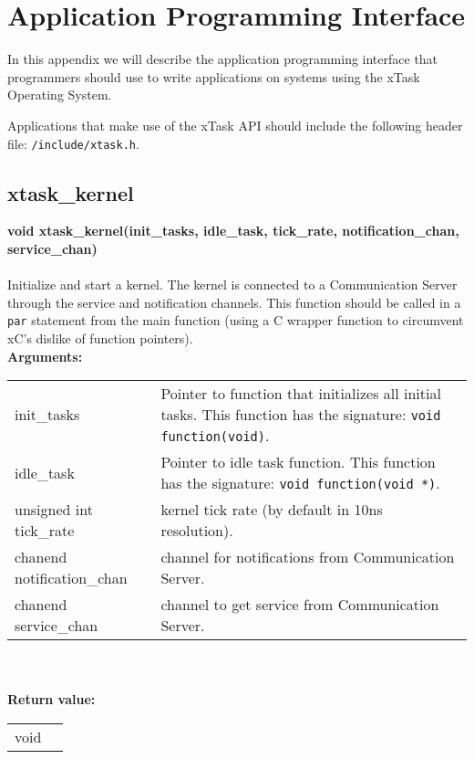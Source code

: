 \newpage
\section{Application Programming Interface}
In this appendix we will describe the application programming interface that
programmers should use to write applications on systems using the
xTask Operating System.

Applications that make use of the xTask API should include the following 
header file: \verb|/include/xtask.h|.

\subsection{xtask\_kernel}
\noindent
\textbf{void xtask\_kernel(init\_tasks, idle\_task, tick\_rate,
notification\_chan, service\_chan)}\\\\
Initialize and start a kernel. The kernel is connected to a 
Communication Server through the service and notification channels.
This function should be called in a \verb|par| statement from the main function 
(using a C wrapper function to circumvent xC's dislike of function pointers).\\

\noindent
\textbf{Arguments:}\\
\indent\begin{tabular}{ p{4.5cm}  p{9cm} }
init\_tasks & Pointer to function that initializes all initial tasks.
              This function has the signature: \verb|void function(void)|. \\
idle\_task  & Pointer to idle task function.
              This function has the signature: \verb|void function(void *)|.\\
unsigned int
tick\_rate  & kernel tick rate (by default in 10ns resolution).\\
chanend
notification\_chan & channel for notifications from Communication Server.\\
chanend
service\_chan      & channel to get service from Communication Server.
\end{tabular}\\\\

\noindent
\textbf{Return value:}\\
\indent\begin{tabular}{  p{4.5cm}  p{9cm} }
void & \\
\end{tabular}

